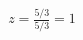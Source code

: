 \documentclass[preview]{standalone}
\begin{document}
\begin{align*}
z = \frac{5/3}{5/3} = 1
\end{align*}
\end{document}
